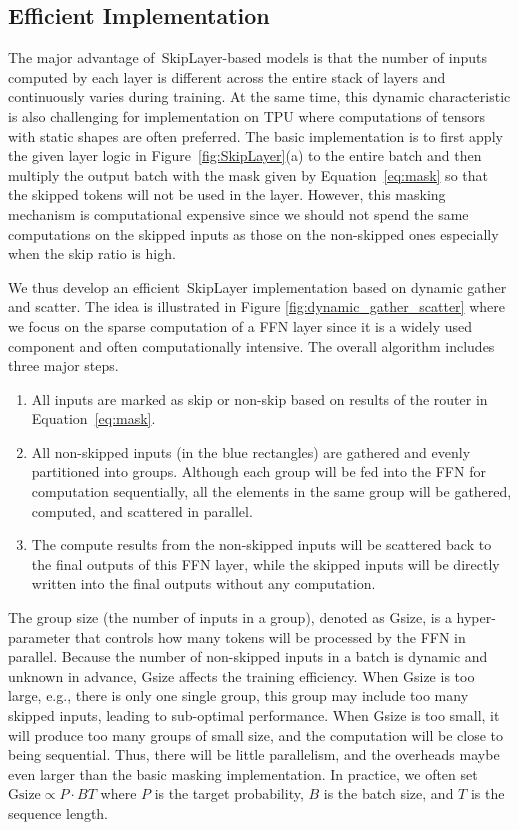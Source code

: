 \documentclass{article}
\newcommand{\skipl}{SkipLayer\xspace}
\begin{document}
\subsection{Efficient Implementation}
\label{sec:efficition_impl}
The major advantage of~\skipl-based models is that the number of inputs computed by each layer is different across the entire stack of layers and continuously varies during training. At the same time, this dynamic characteristic is also challenging for implementation on TPU where computations of tensors with static shapes are often preferred. The basic implementation is to first apply the given layer logic in Figure~\ref{fig:SkipLayer}(a) to the entire batch and then multiply the output batch with the mask given by Equation~\ref{eq:mask} so that the skipped tokens will not be used in the layer. However, this masking mechanism is computational expensive since we should not spend the same computations on the skipped inputs as those on the non-skipped ones especially when the skip ratio is high.

We thus develop an efficient~\skipl implementation based on dynamic gather and scatter. The idea is illustrated in Figure \ref{fig:dynamic_gather_scatter} where we focus on the sparse computation of a FFN layer since it is a widely used component and often computationally intensive. The overall algorithm includes three major steps. 
\begin{enumerate}
    \item All inputs are marked as skip or non-skip based on results of the router in Equation~\ref{eq:mask}.
    \item All non-skipped inputs (in the blue rectangles) are gathered and evenly partitioned into groups. Although each group will be fed into the FFN for computation sequentially, all the elements in the same group will be gathered, computed, and scattered in parallel.
    \item The compute results from the non-skipped inputs will be scattered back to the final outputs of this FFN layer, while the skipped inputs will be directly written into the final outputs without any computation.
\end{enumerate}

The group size (the number of inputs in a group), denoted as Gsize, is a hyper-parameter that controls how many tokens will be processed by the FFN in parallel. Because the number of non-skipped inputs in a batch is dynamic and unknown in advance, Gsize affects the training efficiency. When Gsize is too large, e.g., there is only one single group, this group may include too many skipped inputs, leading to sub-optimal performance. When Gsize is too small, it will produce too many groups of small size, and the computation will be close to being sequential. Thus, there will be little parallelism, and the overheads maybe even larger than the basic masking implementation. In practice, we often set $\text{Gsize}\propto P\cdot BT$ where $P$ is the target probability, $B$ is the batch size, and $T$ is the sequence length.
\end{document}
